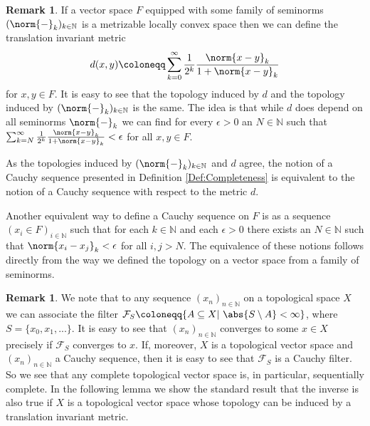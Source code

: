 \documentclass[12pt,a4paper]{article}
\theoremstyle{plain}
\theoremstyle{definition}
\newtheorem{remark}[theorem]{Remark}
\newcommand{\N}{\mathbb{N}}
\newcommand{\nnorm}[2]{\norm{#1}_{#2}}
\begin{document}
\begin{remark}
If a vector space $F$ equipped with some family of seminorms $(\nnorm{-}{k})_{k\in \N}$ is a metrizable locally convex space then we can define the translation invariant metric 
\begin{align*}
    d(x,y)\coloneqq \sum_{k=0}^\infty \frac{1}{2^k}\frac{\nnorm{x-y}{k}}{1+\nnorm{x-y}{k}}
\end{align*}
for $x,y\in F$. It is easy to see that the topology induced by $d$ and the topology induced by $(\nnorm{-}{k})_{k\in \N}$ is the same. The idea is that while $d$ does depend on all seminorms $\nnorm{-}{k}$ we can find for every $\epsilon>0$ an $N\in \N$ such that $\sum_{k=N}^\infty \frac{1}{2^k}\frac{\nnorm{x-y}{k}}{1+\nnorm{x-y}{k}}<\epsilon$ for all $x,y\in F$.

As the topologies induced by $(\nnorm{-}{k})_{k\in \N}$ and $d$ agree, the notion of a Cauchy sequence presented in Definition \ref{Def:Completeness} is equivalent to the notion of a Cauchy sequence with respect to the metric $d$. 

Another equivalent way to define a Cauchy sequence on $F$ is as a sequence $(x_i\in F)_{i\in \N}$ such that for each $k\in \N$ and each $\epsilon>0$ there exists an $N\in \N$ such that $\nnorm{x_i-x_j}{k}<\epsilon$ for all $i,j>N$. The equivalence of these notions follows directly from the way we defined the topology on a vector space from a family of seminorms.
\end{remark}

\begin{remark}
\label{Rem:CompImpliesSeqComp}
We note that to any sequence $(x_n)_{n\in \N}$ on a topological space $X$ we can associate the filter $\mathcal F_S\coloneqq \{A\subseteq X|~\abs{S\setminus A}<\infty \}$, where $S=\{x_0,x_1,...\}$. It is easy to see that $(x_n)_{n\in \N}$ converges to some $x\in X$ precisely if $\mathcal F_S$ converges to $x$. 
If, moreover, $X$ is a topological vector space and $(x_n)_{n\in \N}$ a Cauchy sequence, then it is easy to see that $\mathcal F_S$ is a Cauchy filter. So we see that any complete topological vector space is, in particular, sequentially complete. In the following lemma we show the standard result that the inverse is also true if $X$ is a topological vector space whose topology can be induced by a translation invariant metric.
\end{remark}
\end{document}
